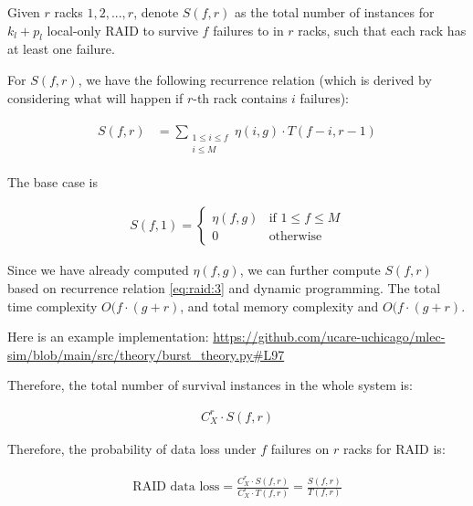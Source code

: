 \documentclass{article}
\begin{document}
Given $r$ racks $1,2,...,r$, denote $S(f,r)$ as the total number of instances for $k_l+p_l$ local-only RAID to survive $f$ failures to in $r$ racks, such that each rack has at least one failure.

For $S(f,r)$, we have the following recurrence relation (which is derived by considering what will happen if $r$-th rack contains $i$ failures):

\begin{eqnarray}
\begin{aligned}
  S(f,r)
  &= \sum_{\substack{1 \leq i \leq f \\ i \leq M}} \eta(i,g) \cdot T(f-i, r-1)
\end{aligned}
\label{eq:raid:3}
\end{eqnarray}

The base case is 

\begin{eqnarray}
  S(f,1) =
    \begin{cases}
      \eta(f,g)& \text{if $1 \leq f \leq M$}\\
      0 & \text{otherwise}
    \end{cases}       
\label{eq:raid:4}
\end{eqnarray}

Since we have already computed $\eta(f,g)$, we can further compute $S(f,r)$ based on recurrence relation \ref{eq:raid:3} and dynamic programming. The total time complexity $O(f \cdot (g+r)$, and total memory complexity and $O(f \cdot (g+r)$.

Here is an example implementation: \url{https://github.com/ucare-uchicago/mlec-sim/blob/main/src/theory/burst_theory.py#L97}

Therefore, the total number of survival instances in the whole system is:

\begin{eqnarray}
C_{X}^{r} \cdot S(f,r)
\label{eq:raid:5}
\end{eqnarray}

Therefore, the probability of data loss under $f$ failures on $r$ racks for RAID is:

\begin{eqnarray}
\begin{aligned}
\text{RAID data loss} = \frac{C_{X}^{r} \cdot S(f,r)} 
{C_{X}^{r} \cdot T(f,r)}
= \frac{ S(f,r)} { T(f,r)}
\end{aligned}
\label{eq:raid:6}
\end{eqnarray}
\end{document}
